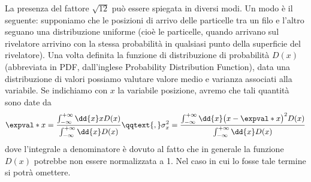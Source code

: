 La presenza del fattore $\sqrt{12}$ può essere spiegata in diversi modi. Un modo è il seguente: supponiamo che le posizioni di arrivo delle particelle tra un filo e l'altro seguano una distribuzione uniforme (cioè le particelle, quando arrivano sul rivelatore arrivino con la stessa probabilità in qualsiasi punto della superficie del rivelatore). Una volta definita la funzione di distribuzione di probabilità $D(x)$ (abbreviata in PDF, dall'inglese Probability Distribution Function), data una distribuzione di valori possiamo valutare valore medio e varianza associati alla variabile. Se indichiamo con $x$ la variabile posizione, avremo che tali quantità sono date da
\begin{equation*}
   \expval*{x}
   =\frac{\int_{-\infty}^{+\infty} \dd{x} x D(x)}{\int_{-\infty}^{+\infty} \dd{x} D(x)}
   \qqtext{,}
   \sigma_x^2
   =\frac{\int_{-\infty}^{+\infty} \dd{x} \bigl( x - \expval*{x} \bigr)^2 D(x)}{\int_{-\infty}^{+\infty} \dd{x} D(x)}
\end{equation*}
dove l'integrale a denominatore è dovuto al fatto che in generale la funzione $D(x)$ potrebbe non essere normalizzata a 1. Nel caso in cui lo fosse tale termine si potrà omettere.

